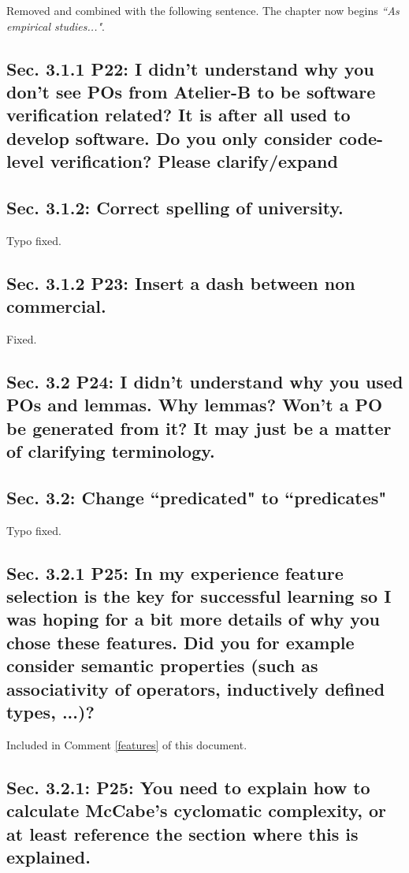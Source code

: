 \documentclass[]{article}
\begin{document}
Removed and combined with the following sentence. The chapter now begins \emph{``As empirical studies..."}.

\subsection{Sec. 3.1.1 P22: I didn't understand why you don't see POs from Atelier-B to be software verification related? It is after all used to develop software. Do you only consider code-level verification? Please clarify/expand}

\subsection{Sec. 3.1.2: Correct spelling of university.}

Typo fixed.

\subsection{Sec. 3.1.2 P23: Insert a dash between non commercial.}

Fixed.

\subsection{Sec. 3.2 P24: I didn't understand why you used POs and lemmas. Why lemmas? Won't a PO be generated from it? It may just be a matter of clarifying terminology.}

\subsection{Sec. 3.2: Change ``predicated" to ``predicates"}

Typo fixed.

\subsection{Sec. 3.2.1 P25: In my experience feature selection is the key for successful learning so I was hoping for a bit more details of why you chose these features. Did you for example consider semantic properties (such as associativity of operators, inductively defined types, ...)?}

Included in Comment \ref{features} of this document. 

\subsection{Sec. 3.2.1: P25: You need to explain how to calculate McCabe's cyclomatic complexity, or at least reference the section where this is explained.}
\end{document}
